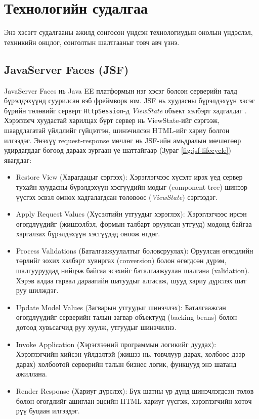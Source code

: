 \section{Технологийн судалгаа}
\label{sec:tech-review}

Энэ хэсэгт судалгааны ажилд сонгосон үндсэн технологиудын онолын үндэслэл, техникийн онцлог, сонголтын шалтгааныг товч авч үзнэ.

\subsection{JavaServer Faces (JSF)}

JavaServer Faces нь Java EE платформын нэг хэсэг болсон серверийн талд бүрэлдэхүүнд суурилсан вэб фреймворк юм. JSF нь хуудасны бүрэлдэхүүн хэсэг бүрийн төлөвийг серверт \texttt{HttpSession}-д \textit{ViewState} объект хэлбэрт хадгалдаг \cite{esposito2019}. Хэрэглэгч хуудастай харилцах бүрт сервер нь ViewState-ийг сэргээж, шаардлагатай үйлдлийг гүйцэтгэн, шинэчилсэн HTML-ийг хариу болгон илгээдэг. Энэхүү request-response мөчлөг нь JSF-ийн амьдралын мөчлөгөөр удирдагддаг бөгөөд дараах зургаан үе шаттайгаар (Зураг \ref{fig:jsf-lifecycle}) явагддаг:

\begin{itemize}
\item Restore View (Харагдацыг сэргээх): Хэрэглэгчээс хүсэлт ирэх үед сервер тухайн хуудасны бүрэлдэхүүн хэсгүүдийн модыг (component tree) шинээр үүсгэх эсвэл өмнөх хадгалагдсан төлөвөөс (\textit{ViewState}) сэргээдэг.
\item Apply Request Values (Хүсэлтийн утгуудыг хэрэглэх): Хэрэглэгчээс ирсэн өгөгдлүүдийг (жишээлбэл, формын талбарт оруулсан утгууд) модонд байгаа харгалзах бүрэлдэхүүн хэсгүүдэд оноож өгдөг.
\item Process Validations (Баталгаажуулалтыг боловсруулах): Оруулсан өгөгдлийн төрлийг зохих хэлбэрт хувиргах (conversion) болон өгөгдсөн дүрэм, шалгууруудад нийцэж байгаа эсэхийг баталгаажуулан шалгана (validation). Хэрэв алдаа гарвал дараагийн шатуудыг алгасаж, шууд хариу дүрслэх шат руу шилждэг.
\item Update Model Values (Загварын утгуудыг шинэчлэх): Баталгаажсан өгөгдлүүдийг серверийн талын загвар объектууд (backing beans) болон дотоод хувьсагчид руу хуулж, утгуудыг шинэчилнэ.
\item Invoke Application (Хэрэглээний программын логикийг дуудах): Хэрэглэгчийн хийсэн үйлдэлтэй (жишээ нь, товчлуур дарах, холбоос дээр дарах) холбоотой серверийн талын бизнес логик, функцууд энэ шатанд ажиллана.
\item Render Response (Хариуг дүрслэх): Бүх шатны үр дүнд шинэчлэгдсэн төлөв болон өгөгдлийг ашиглан эцсийн HTML хариуг үүсгэж, хэрэглэгчийн хөтөч рүү буцаан илгээдэг.
\end{itemize}

